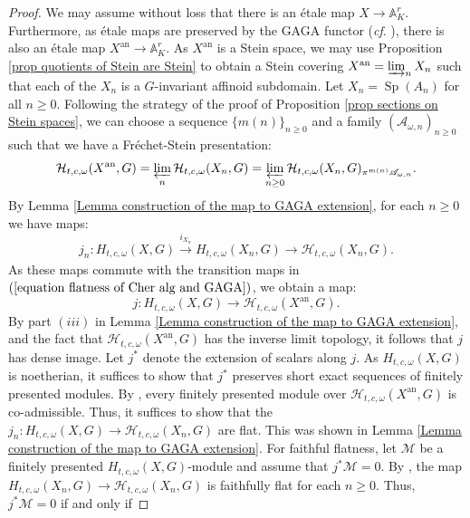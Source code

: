 \documentclass{amsart}
\newcommand{\Sp}{\operatorname{Sp}}
\begin{document}
\begin{proof}
 We may assume without loss that there is an étale map $X\rightarrow \mathbb{A}^r_K$. Furthermore, as étale maps are preserved by the GAGA functor  (\emph{cf}. \cite[Theorem 5.2.1]{Conrad1999}), there is also an étale map $X^{\operatorname{an}}\rightarrow \mathbb{A}^r_K$. As $X^{\operatorname{an}}$
is a Stein space, we may use Proposition \ref{prop quotients of Stein are Stein} to obtain a Stein covering $X^{\operatorname{an}}=\varinjlim_n X_n$ such that each of the $X_n$ is a $G$-invariant affinoid subdomain. Let $X_n=\Sp(A_n)$ for all $n\geq 0$. Following the strategy of the proof of Proposition \ref{prop sections on Stein spaces}, we can choose a sequence $\{m(n) \}_{n\geq 0}$  and a family $(\mathscr{A}_{\omega,n})_{n\geq 0}$
such that we have a Fréchet-Stein presentation:
\begin{equation}\label{equation flatness of Cher alg and GAGA}
    \mathcal{H}_{t,c,\omega}(X^{\operatorname{an}},G)=\varprojlim_n\mathcal{H}_{t,c,\omega}(X_n,G)=\varprojlim_{n\geq 0}\mathcal{H}_{t,c,\omega}(X_n,G)_{\pi^{m(n)}\mathscr{A}_{\omega,n}}.
\end{equation}
By Lemma \ref{Lemma construction of the map to GAGA extension}, for each $n\geq 0$ we have maps:
\begin{equation*}
    j_n:H_{t,c,\omega}(X,G)\xrightarrow[]{i_{X_n}}H_{t,c,\omega}(X_n,G)\rightarrow \mathcal{H}_{t,c,\omega}(X_n,G).
\end{equation*}
As these maps commute with the transition maps in $(\ref{equation flatness of Cher alg and GAGA})$, we obtain a map:
\begin{equation*}
    j:H_{t,c,\omega}(X,G)\rightarrow \mathcal{H}_{t,c,\omega}(X^{\operatorname{an}},G).
\end{equation*}
By part $(iii)$
in Lemma \ref{Lemma construction of the map to GAGA extension}, and the fact that $\mathcal{H}_{t,c,\omega}(X^{\operatorname{an}},G)$ has the inverse limit topology, it follows that $j$ has dense image.  Let $j^*$ denote the extension of scalars along $j$. As $H_{t,c,\omega}(X,G)$ is noetherian, it suffices to show that $j^*$ preserves short exact sequences of finitely presented modules.  By \cite[Corollary 3.4]{schneider2002algebras}, every finitely presented module over  $\mathcal{H}_{t,c,\omega}(X^{\operatorname{an}},G)$ is co-admissible.  Thus, 
it suffices to show that  the $j_n:H_{t,c,\omega}(X,G)\rightarrow \mathcal{H}_{t,c,\omega}(X_n,G)$ are flat. This was shown in Lemma \ref{Lemma construction of the map to GAGA extension}. For faithful flatness, let $\mathcal{M}$ be a finitely presented $H_{t,c,\omega}(X,G)$-module and assume that $j^*\mathcal{M}=0$. By \cite[Proposition 4.4.18]{p-adicCheralg}, the map $H_{t,c,\omega}(X_n,G)\rightarrow \mathcal{H}_{t,c,\omega}(X_n,G)$ is faithfully flat for each $n\geq 0$. Thus, $j^*\mathcal{M}=0$ if and only if 

\end{proof}
\end{document}
